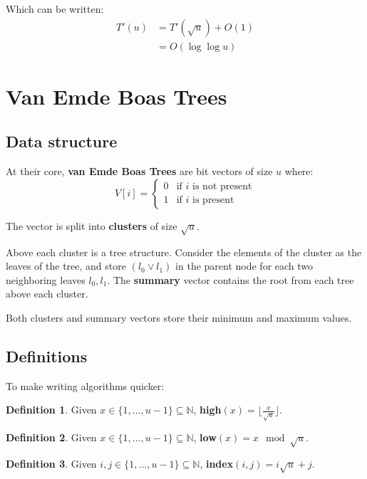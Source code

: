 \documentclass[11pt]{article}
\theoremstyle{plain}
\theoremstyle{definition}
\newtheorem*{defn}{Definition}
\newcommand{\N}{\mathbb{N}}
\begin{document}
Which can be written:
\begin{align}
    T'(u) &= T'(\sqrt u) + O(1)\\
          &= O(\log\log u)
\end{align}

\section{Van Emde Boas Trees}
\subsection{Data structure}

At their core, \textbf{van Emde Boas Trees} are bit vectors of size $u$ where:
\[
V[i] = 
    \begin{cases}
        0 & \text{if } i \text{ is not present}\\
        1 & \text{if } i \text{ is present}
    \end{cases}
\]

The vector is split into \textbf{clusters} of size $\sqrt u$.

Above each cluster is a tree structure. Consider the elements of the cluster as the
leaves of the tree, and store $(l_0 \vee l_1)$ in the parent node for each two neighboring leaves 
$l_0, l_1$. The \textbf{summary} vector contains the root from each tree above each cluster.

Both clusters and summary vectors store their minimum and maximum values.

\subsection{Definitions}

To make writing algorithms quicker:

\begin{defn}
    Given $x \in \{1, \ldots, u - 1\} \subseteq \N$, \textbf{high}$(x) = \lfloor \frac{x}{\sqrt{u}}\rfloor$.
\end{defn}

\begin{defn}
    Given $x \in \{1, \ldots, u - 1\} \subseteq \N$, \textbf{low}$(x) = x \mod \sqrt{u}$.
\end{defn}

\begin{defn}
    Given $i, j \in \{1, \ldots, u - 1\} \subseteq \N$, \textbf{index}$(i, j) = i\sqrt{u} + j$.
\end{defn}
\end{document}
